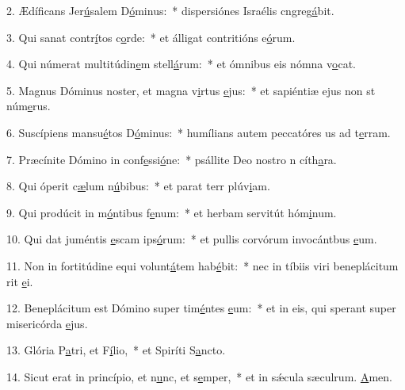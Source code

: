 2. Ædíficans Jer\uline{ú}salem D\uline{ó}minus:~* dispersiónes Israélis cngreg\uline{á}bit.\par 
3. Qui sanat contr\uline{í}tos c\uline{o}rde:~* et álligat contritións e\uline{ó}rum.\par 
4. Qui númerat multitúdin\uline{e}m stell\uline{á}rum:~* et ómnibus eis nómna v\uline{o}cat.\par 
5. Magnus Dóminus noster, et magna v\uline{i}rtus \uline{e}jus:~* et sapiéntiæ ejus non st núm\uline{e}rus.\par 
6. Suscípiens mansu\uline{é}tos D\uline{ó}minus:~* humílians autem peccatóres us ad t\uline{e}rram.\par 
7. Præcínite Dómino in conf\uline{e}ssi\uline{ó}ne:~* psállite Deo nostro n cíth\uline{a}ra.\par 
8. Qui óperit c\uline{æ}lum n\uline{ú}bibus:~* et parat terr plúv\uline{i}am.\par 
9. Qui prodúcit in m\uline{ó}ntibus f\uline{e}num:~* et herbam servitút hóm\uline{i}num.\par 
10. Qui dat juméntis \uline{e}scam ips\uline{ó}rum:~* et pullis corvórum invocántbus \uline{e}um.\par 
11. Non in fortitúdine equi volunt\uline{á}tem hab\uline{é}bit:~* nec in tíbiis viri beneplácitum rit \uline{e}i.\par 
12. Beneplácitum est Dómino super tim\uline{é}ntes \uline{e}um:~* et in eis, qui sperant super misericórda \uline{e}jus.\par 
13. Glória P\uline{a}tri, et F\uline{í}lio,~* et Spiríti S\uline{a}ncto.\par 
14. Sicut erat in princípio, et n\uline{u}nc, et s\uline{e}mper,~* et in sǽcula sæculrum. \uline{A}men.\par 

